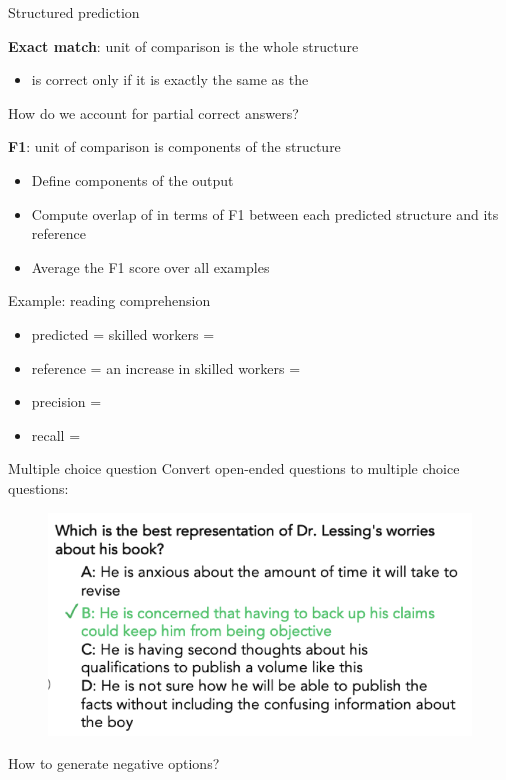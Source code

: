 \documentclass[usenames,dvipsnames,notes,11pt,aspectratio=169,hyperref={colorlinks=true, linkcolor=blue}]{beamer}
\begin{document}
\begin{frame}
    {Structured prediction}

    \textbf{Exact match}: unit of comparison is the whole structure\\
    \begin{itemize}
        \item {} is correct only if it is exactly the same as the 
    \end{itemize}

    \pause
    How do we account for partial correct answers?

    \textbf{F1}: unit of comparison is components of the structure\\
    \begin{itemize}
        \item Define components of the output
        \item Compute overlap of  in terms of F1 between each predicted structure and its reference 
        \item Average the F1 score over all examples
    \end{itemize}
    \pause

    Example: reading comprehension\\
    \begin{itemize}
        \item predicted = skilled workers = 
        \item reference = an increase in skilled workers = 
        \item precision =
        \item recall =
    \end{itemize}
\end{frame}

\begin{frame}
    {Multiple choice question}
    Convert open-ended questions to multiple choice questions:

    \begin{figure}
        \includegraphics[height=0.5\textheight]{figures/quality}
    \end{figure}

    How to generate negative options?
\end{frame}
\end{document}
